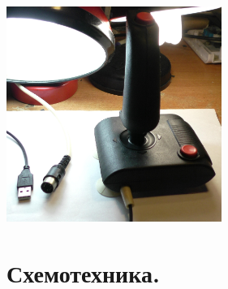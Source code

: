 \documentclass[12pt,a4paper]{article}
\begin{document}
\includegraphics[width=7cm]{gamepad.jpg}\\

\newpage

\section{Схемотехника.}
\end{document}
